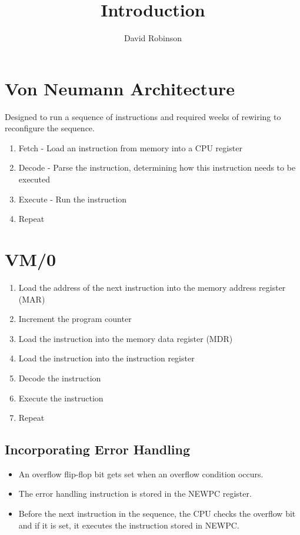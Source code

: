 \documentclass{article}
\title{Introduction}
\author{David Robinson}
\date{}
\begin{document}
\maketitle

\section*{Von Neumann Architecture}

Designed to run a sequence of instructions and required weeks of rewiring to reconfigure the sequence.

\begin{enumerate}
    \item Fetch - Load an instruction from memory into a CPU register
    \item Decode - Parse the instruction, determining how this instruction needs to be executed
    \item Execute - Run the instruction
    \item Repeat
\end{enumerate}

\section*{VM/0}

\begin{enumerate}
    \item Load the address of the next instruction into the memory address register (MAR)
    \item Increment the program counter
    \item Load the instruction into the memory data register (MDR)
    \item Load the instruction into the instruction register
    \item Decode the instruction
    \item Execute the instruction
    \item Repeat
\end{enumerate}

\subsection*{Incorporating Error Handling}

\begin{itemize}
    \item An overflow flip-flop bit gets set when an overflow condition occurs.
    \item The error handling instruction is stored in the NEWPC register.
    \item Before the next instruction in the sequence, the CPU checks the overflow bit and if it is set, it executes the instruction stored in NEWPC.
\end{itemize}
\end{document}

